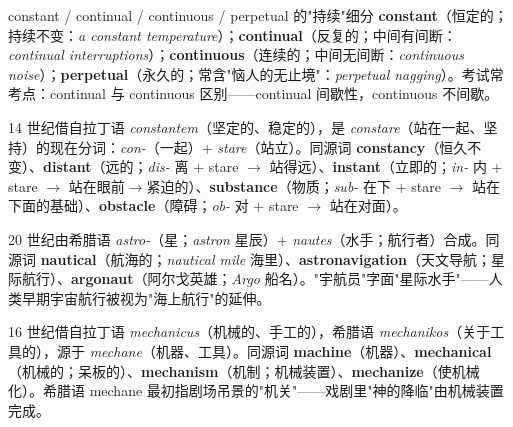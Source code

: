 \documentclass[../main.tex]{subfiles}
\begin{document}
\begin{lex}{constant / continual / continuous / perpetual 的"持续"细分}
\textbf{constant}（恒定的；持续不变：\textit{a constant temperature}）；\textbf{continual}（反复的；中间有间断：\textit{continual interruptions}）；\textbf{continuous}（连续的；中间无间断：\textit{continuous noise}）；\textbf{perpetual}（永久的；常含"恼人的无止境"：\textit{perpetual nagging}）。考试常考点：continual 与 continuous 区别——continual 间歇性，continuous 不间歇。
\end{lex}

\begin{origin}
14 世纪借自拉丁语 \textit{constantem}（坚定的、稳定的），是 \textit{constare}（站在一起、坚持）的现在分词：\textit{con-}（一起）+ \textit{stare}（站立）。同源词 \textbf{constancy}（恒久不变）、\textbf{distant}（远的；\textit{dis-} 离 + stare $\to$ 站得远）、\textbf{instant}（立即的；\textit{in-} 内 + stare $\to$ 站在眼前$\to$紧迫的）、\textbf{substance}（物质；\textit{sub-} 在下 + stare $\to$ 站在下面的基础）、\textbf{obstacle}（障碍；\textit{ob-} 对 + stare $\to$ 站在对面）。
\end{origin}




\begin{origin}
20 世纪由希腊语 \textit{astro-}（星；\textit{astron} 星辰）+ \textit{nautes}（水手；航行者）合成。同源词 \textbf{nautical}（航海的；\textit{nautical mile} 海里）、\textbf{astronavigation}（天文导航；星际航行）、\textbf{argonaut}（阿尔戈英雄；\textit{Argo} 船名）。"宇航员"字面"星际水手"——人类早期宇宙航行被视为"海上航行"的延伸。
\end{origin}



\begin{origin}
16 世纪借自拉丁语 \textit{mechanicus}（机械的、手工的），希腊语 \textit{mechanikos}（关于工具的），源于 \textit{mechane}（机器、工具）。同源词 \textbf{machine}（机器）、\textbf{mechanical}（机械的；呆板的）、\textbf{mechanism}（机制；机械装置）、\textbf{mechanize}（使机械化）。希腊语 mechane 最初指剧场吊景的"机关"——戏剧里"神的降临"由机械装置完成。
\end{origin}
\end{document}
